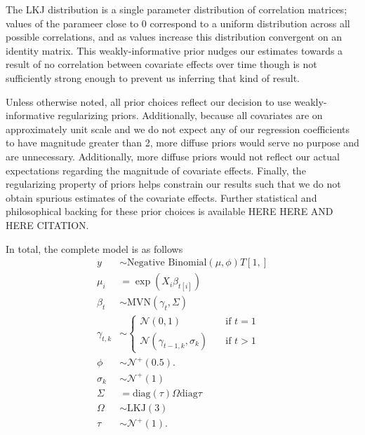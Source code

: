\documentclass[12pt,letterpaper]{article}
\begin{document}
The LKJ distribution is a single parameter distribution of correlation matrices; values of the parameer close to 0 correspond to a uniform distribution across all possible correlations, and as values increase this distribution convergent on an identity matrix. This weakly-informative prior nudges our estimates towards a result of no correlation between covariate effects over time though is not sufficiently strong enough to prevent us inferring that kind of result.

Unless otherwise noted, all prior choices reflect our decision to use weakly-informative regularizing priors. Additionally, because all covariates are on approximately unit scale and we do not expect any of our regression coefficients to have magnitude greater than 2, more diffuse priors would serve no purpose and are unnecessary. Additionally, more diffuse priors would not reflect our actual expectations regarding the magnitude of covariate effects. Finally, the regularizing property of priors helps constrain our results such that we do not obtain spurious estimates of the covariate effects. Further statistical and philosophical backing for these prior choices is available HERE HERE AND HERE CITATION.

In total, the complete model is as follows
\begin{equation}
  \begin{aligned}
    y &\sim \text{Negative Binomial}(\mu, \phi) T[1, ] \\
    \mu_{i} &= \exp(X_{i} \beta_{t[i]}) \\
    \beta_{t} &\sim \text{MVN}(\gamma_{t}, \Sigma) \\
    \gamma_{t, k} &\sim 
      \begin{cases}
        \mathcal{N}(0, 1) & \quad \text{if } t = 1 \\
        \mathcal{N}(\gamma_{t - 1, k}, \sigma_{k}) & \quad \text{if } t > 1
      \end{cases} \\
    \phi &\sim \mathcal{N}^{+}(0.5). \\
    \sigma_{k} &\sim \mathcal{N}^{+}(1) \\ 
    \Sigma &= \text{diag}(\tau) \Omega \text{diag}{\tau} \\
    \Omega &\sim \text{LKJ}(3) \\
    \tau &\sim \mathcal{N}^{+}(1). \\
  \end{aligned}
\end{equation}
\end{document}
